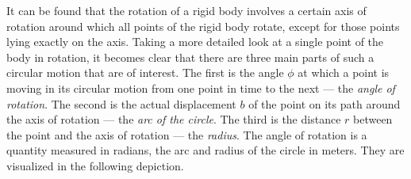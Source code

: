 \begin{figure}[h!]
	\centering

	
\end{figure}

\pagebreak


It can be found that the rotation of a rigid body involves a certain axis of rotation around which all points of the rigid body rotate, except for those points lying exactly on the axis. Taking a more detailed look at a single point of the body in rotation, it becomes clear that there are three main parts of such a circular motion that are of interest. The first is the angle $\phi$ at which a point is moving in its circular motion from one point in time to the next --- the \emph{angle of rotation}. The second is the actual displacement $b$ of the point on its path around the axis of rotation --- the \emph{arc of the circle}. The third is the distance $r$ between the point and the axis of rotation --- the \emph{radius}. The angle of rotation is a quantity measured in radians, the arc and radius of the circle in meters. They are visualized in the following depiction. 

